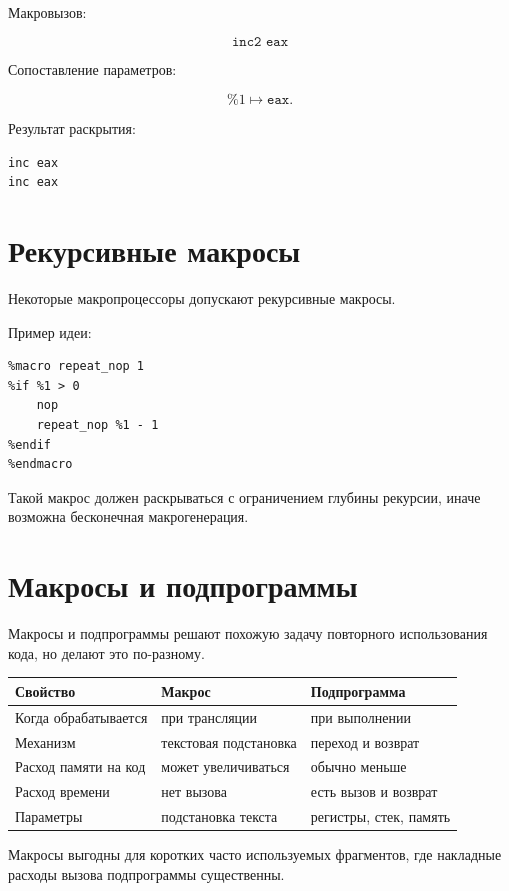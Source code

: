 \documentclass[12pt,a4paper]{article}
\begin{document}
Макровызов:

\[
\texttt{inc2 eax}
\]

Сопоставление параметров:

\[
\%1 \mapsto \texttt{eax}.
\]

Результат раскрытия:

\begin{lstlisting}
inc eax
inc eax
\end{lstlisting}

\section{Рекурсивные макросы}

Некоторые макропроцессоры допускают рекурсивные макросы.

Пример идеи:

\begin{lstlisting}
%macro repeat_nop 1
%if %1 > 0
    nop
    repeat_nop %1 - 1
%endif
%endmacro
\end{lstlisting}

Такой макрос должен раскрываться с ограничением глубины рекурсии, иначе возможна бесконечная макрогенерация.

\section{Макросы и подпрограммы}

Макросы и подпрограммы решают похожую задачу повторного использования кода, но делают это по-разному.

\begin{center}
\begin{tabular}{lll}
\toprule
Свойство & Макрос & Подпрограмма \\
\midrule
Когда обрабатывается & при трансляции & при выполнении \\
Механизм & текстовая подстановка & переход и возврат \\
Расход памяти на код & может увеличиваться & обычно меньше \\
Расход времени & нет вызова & есть вызов и возврат \\
Параметры & подстановка текста & регистры, стек, память \\
\bottomrule
\end{tabular}
\end{center}

Макросы выгодны для коротких часто используемых фрагментов, где накладные расходы вызова подпрограммы существенны.
\end{document}
